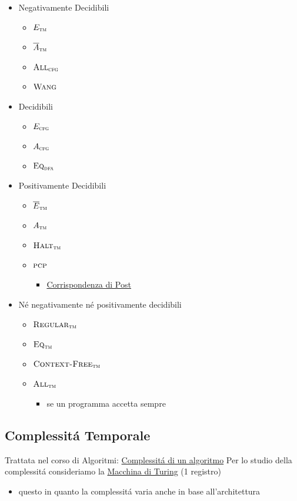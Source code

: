 \documentclass[
                        12pt, %
                        a4paper, %
                        oneside, %
                        headinclude,footinclude, %
                        BCOR5mm, %
                  ]{scrartcl}
\begin{document}
\begin{itemize}
\item Negativamente Decidibili
\begin{itemize}
\item \(E_{\textsc{tm}}\)
\item \(\overline A_{\textsc{tm}}\)
\item \(\textsc{All}_{\textsc{cfg}}\)
\item \(\textsc{Wang}\)
\end{itemize}
\item Decidibili
\begin{itemize}
\item \(E_{\textsc{cfg}}\)
\item \(A_{\textsc{cfg}}\)
\item \(\textsc{Eq}_{\textsc{dfa}}\)
\end{itemize}
\item Positivamente Decidibili
\begin{itemize}
\item \(\overline E_{\textsc{tm}}\)
\item \(A_{\textsc{tm}}\)
\item \(\textsc{Halt}_{\textsc{tm}}\)
\item \(\textsc{pcp}\)
\begin{itemize}
\item \hyperref[sec:org3a852ff]{Corrispondenza di Post}
\end{itemize}
\end{itemize}
\item Né negativamente né positivamente decidibili
\begin{itemize}
\item \(\textsc{Regular}_{\textsc{tm}}\)
\item \(\textsc{Eq}_{\textsc{tm}}\)
\item \(\textsc{Context-Free}_{\textsc{tm}}\)
\item \(\textsc{All}_{\textsc{tm}}\)
\begin{itemize}
\item se un programma accetta sempre
\end{itemize}
\end{itemize}
\end{itemize}
\subsection{Complessitá Temporale}
\label{sec:org08ab2e4}
Trattata nel corso di Algoritmi: \href{20210414192358-problems_algorithms.org}{Complessitá di un algoritmo}
Per lo studio della complessitá consideriamo la \uline{Macchina di Turing} (1 registro)
\begin{itemize}
\item questo in quanto la complessitá varia anche in base all'architettura
\end{itemize}
\end{document}
